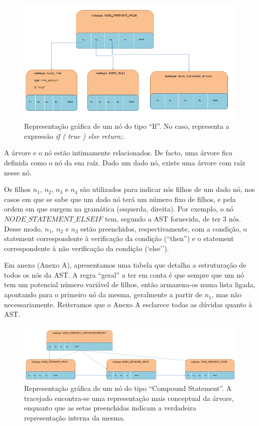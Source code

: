 \documentclass[11pt,a4paper]{article}
\begin{document}
\begin{figure}[H]
  \centering
      \includegraphics[width=\textwidth,height=\textheight,keepaspectratio]{If_Statement.png}
  \caption{Representação gráfica de um nó do tipo ``If''. No caso, representa a expressão \emph{if ( true ) {} else return;.}}
\end{figure}

A árvore e o nó estão intimamente relacionados.  De facto, uma árvore fica definida como o nó da sua raíz. Dado um dado nó, existe uma árvore com raíz nesse nó.

Os filhos $n_1$, $n_2$, $n_3$ e $n_4$ são utilizados para indicar nós filhos de um dado nó, nos casos em que se sabe que um dado nó terá um número fixo de filhos, e pela ordem em que surgem na gramática (esquerda, direita). Por exemplo, o nó $NODE\_STATEMENT\_ELSEIF$ tem, segundo a AST fornecida, de ter 3 nós. Desse modo, $n_1$, $n_2$ e $n_3$ estão preenchidos, respectivamente, com a condição, o statement correspondente à verificação da condição (``then'') e o statement correspondente à não verificação da condição (`else'').

Em anexo (Anexo A), apresentamos uma tabela que detalha a estruturação de todos os nós da AST. A regra ``geral'' a ter em conta é que sempre que um nó tem um potencial número variável de filhos, então armazena-os numa lista ligada, apontando para o primeiro nó da mesma, geralmente a partir de $n_1$, mas não necessariamente. Reiteramos que o Anexo A esclarece todas as dúvidas quanto à AST.

\begin{figure}[H]
  \centering
      \includegraphics[width=\textwidth,height=\textheight,keepaspectratio]{Compound_Statement.png}
  \caption{Representação gráfica de um nó do tipo ``Compound Statement''. A tracejado encontra-se uma representação mais conceptual da árvore, enquanto que as setas preenchidas indicam a verdadeira representação interna da mesma.}
\end{figure}
\end{document}
